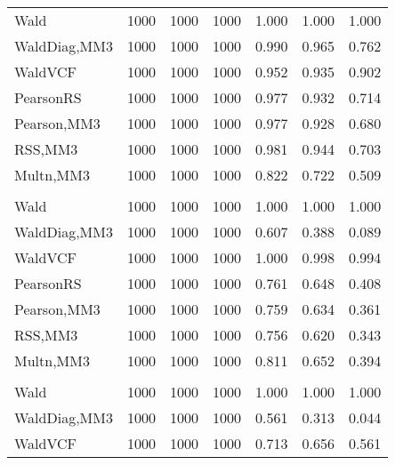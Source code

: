\documentclass[
]{article}
\begin{document}
\begin{table}[H]
{\begin{tabular}[t]{lrrrrrr}
\hspace{1em}Wald & 1000 & 1000 & 1000 & 1.000 & 1.000 & \vphantom{2} 1.000\\
\hspace{1em}WaldDiag,MM3 & 1000 & 1000 & 1000 & 0.990 & 0.965 & 0.762\\
\hspace{1em}WaldVCF & 1000 & 1000 & 1000 & 0.952 & 0.935 & 0.902\\
\hspace{1em}PearsonRS & 1000 & 1000 & 1000 & 0.977 & 0.932 & 0.714\\
\hspace{1em}Pearson,MM3 & 1000 & 1000 & 1000 & 0.977 & 0.928 & 0.680\\
\hspace{1em}RSS,MM3 & 1000 & 1000 & 1000 & 0.981 & 0.944 & 0.703\\
\hspace{1em}Multn,MM3 & 1000 & 1000 & 1000 & 0.822 & 0.722 & 0.509\\
\addlinespace[0.3em]
\multicolumn{7}{l}{\textbf{2F 10V}}\\
\hspace{1em}Wald & 1000 & 1000 & 1000 & 1.000 & 1.000 & \vphantom{1} 1.000\\
\hspace{1em}WaldDiag,MM3 & 1000 & 1000 & 1000 & 0.607 & 0.388 & 0.089\\
\hspace{1em}WaldVCF & 1000 & 1000 & 1000 & 1.000 & 0.998 & 0.994\\
\hspace{1em}PearsonRS & 1000 & 1000 & 1000 & 0.761 & 0.648 & 0.408\\
\hspace{1em}Pearson,MM3 & 1000 & 1000 & 1000 & 0.759 & 0.634 & 0.361\\
\hspace{1em}RSS,MM3 & 1000 & 1000 & 1000 & 0.756 & 0.620 & 0.343\\
\hspace{1em}Multn,MM3 & 1000 & 1000 & 1000 & 0.811 & 0.652 & 0.394\\
\addlinespace[0.3em]
\multicolumn{7}{l}{\textbf{3F 15V}}\\
\hspace{1em}Wald & 1000 & 1000 & 1000 & 1.000 & 1.000 & 1.000\\
\hspace{1em}WaldDiag,MM3 & 1000 & 1000 & 1000 & 0.561 & 0.313 & 0.044\\
\hspace{1em}WaldVCF & 1000 & 1000 & 1000 & 0.713 & 0.656 & 0.561\\

\end{tabular}}
\end{table}
\end{document}
